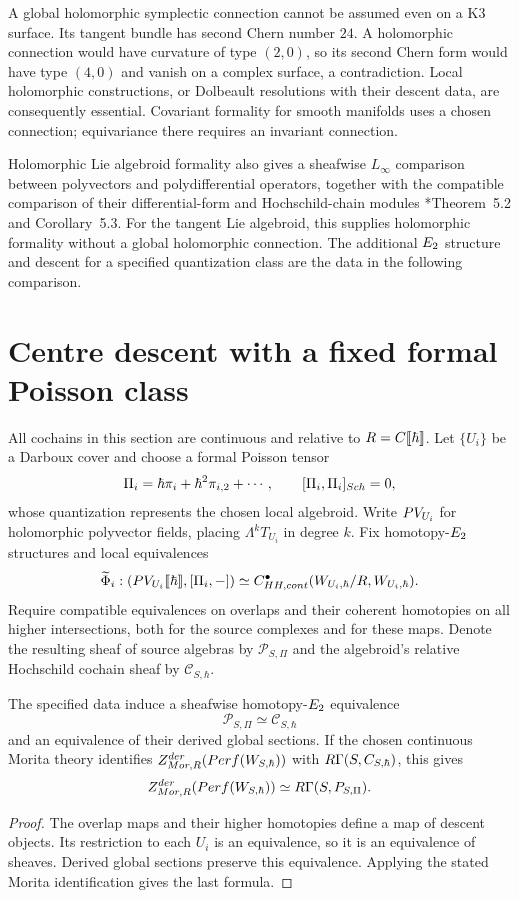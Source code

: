 A global holomorphic symplectic connection cannot be assumed even on
a K3 surface.  Its tangent bundle has second Chern number $24$.
A holomorphic connection would have curvature of type $(2,0)$, so
its second Chern form would have type $(4,0)$ and vanish on a complex
surface, a contradiction.  Local holomorphic constructions, or
Dolbeault resolutions with their descent data, are consequently
essential.  Covariant formality for smooth manifolds
\cite{DolgushevCov} uses a chosen connection; equivariance there
requires an invariant connection.

Holomorphic Lie algebroid formality also gives a sheafwise
$L_\infty$ comparison between polyvectors and polydifferential
operators, together with the compatible comparison of their
differential-form and Hochschild-chain modules
\cite{CalaqueDolgushevHalbout}*{Theorem~5.2 and Corollary~5.3}.
For the tangent Lie algebroid, this supplies holomorphic formality
without a global holomorphic connection.  The additional
$E_2$ structure and descent for a specified quantization class
are the data in the following comparison.

\section{Centre descent with a fixed formal Poisson class}
All cochains in this section are continuous and relative to
$R=C\llbracket\hbar\rrbracket$.
Let $\{U_i\}$ be a Darboux cover and choose a formal Poisson tensor
\[
 \Pi_i=\hbar\pi_i+\hbar^2\pi_{i,2}+\cdots,
 \qquad [\Pi_i,\Pi_i]_{Sch}=0,
\]
whose quantization represents the chosen local algebroid.
Write $PV_{U_i}$ for holomorphic polyvector fields, placing
$\Lambda^kT_{U_i}$ in degree $k$.
Fix homotopy-$E_2$ structures and local equivalences
\[
 \widetilde\Phi_i:
 (PV_{U_i}\llbracket\hbar\rrbracket,[\Pi_i,-])
 \simeq C^\bullet_{HH,cont}
       (W_{U_i,\hbar}/R,W_{U_i,\hbar}).
\]
Require compatible equivalences on overlaps and their coherent
homotopies on all higher intersections, both for the source complexes
and for these maps.  Denote the resulting sheaf of source algebras
by $\mathcal P_{S,\Pi}$ and the algebroid's relative Hochschild
cochain sheaf by $\mathcal C_{S,\hbar}$.

\begin{theorem}
The specified data induce a sheafwise homotopy-$E_2$ equivalence
\[
 \mathcal P_{S,\Pi}\simeq\mathcal C_{S,\hbar}
\]
and an equivalence of their derived global sections.
If the chosen continuous Morita theory identifies
$Z_{Mor,R}^{der}(Perf(W_{S,\hbar}))$
with $R\Gamma(S,C_{S,\hbar})$, this gives
\[
 Z_{Mor,R}^{der}
       (Perf(W_{S,\hbar}))
 \simeq R\Gamma(S,P_{S,\Pi}).
\]
\end{theorem}
\begin{proof}
The overlap maps and their higher homotopies define a map of descent
objects.  Its restriction to each $U_i$ is an equivalence, so it is
an equivalence of sheaves.  Derived global sections preserve this
equivalence.  Applying the stated Morita identification gives the
last formula.
\end{proof}

